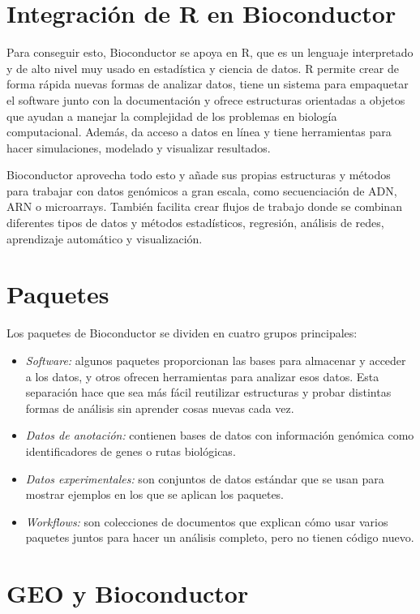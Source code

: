 \section{Integración de R en Bioconductor}
Para conseguir esto, Bioconductor se apoya en R, que es un lenguaje interpretado y de alto nivel muy usado en estadística y ciencia de datos. R permite 
crear de forma rápida nuevas formas de analizar datos, tiene un sistema para empaquetar el software junto con la documentación y ofrece estructuras orientadas a 
objetos que ayudan a manejar la complejidad de los problemas en biología computacional. Además, da acceso a datos en línea y tiene herramientas para 
hacer simulaciones, modelado y visualizar resultados.

Bioconductor aprovecha todo esto y añade sus propias estructuras y métodos para trabajar con datos genómicos a gran escala, como secuenciación de ADN, 
ARN o microarrays. También facilita crear flujos de trabajo donde se combinan diferentes tipos de datos y métodos estadísticos, regresión, análisis de 
redes, aprendizaje automático y visualización.


\section{Paquetes}

Los paquetes de Bioconductor se dividen en cuatro grupos principales:

\begin{itemize}
\item \textit{Software:} algunos paquetes proporcionan las bases para almacenar y acceder a los datos, y otros ofrecen herramientas para analizar esos 
datos. Esta separación hace que sea más fácil reutilizar estructuras y probar distintas formas de análisis sin aprender cosas nuevas cada vez.
\item \textit{Datos de anotación:} contienen bases de datos con información genómica como identificadores de genes o rutas biológicas.
\item \textit{Datos experimentales:} son conjuntos de datos estándar que se usan para mostrar ejemplos en los que se aplican los paquetes.
\item \textit{Workflows:} son colecciones de documentos que explican cómo usar varios paquetes juntos para hacer un análisis completo, pero no tienen 
código nuevo.
\end{itemize}


\section{GEO y Bioconductor}

